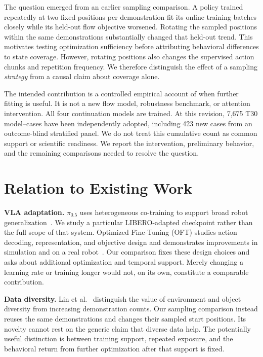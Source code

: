 \documentclass[conference]{IEEEtran}
\newcommand{\piV}{\ensuremath{\pi_{0.5}}}
\begin{document}
The question emerged from an earlier sampling comparison. A policy trained repeatedly at two fixed positions per demonstration fit its online training batches closely while its held-out flow objective worsened. Rotating the sampled positions within the same demonstrations substantially changed that held-out trend. This motivates testing optimization sufficiency before attributing behavioral differences to state coverage. However, rotating positions also changes the supervised action chunks and repetition frequency. We therefore distinguish the effect of a sampling \emph{strategy} from a causal claim about coverage alone.

The intended contribution is a controlled empirical account of when further fitting is useful. It is not a new flow model, robustness benchmark, or attention intervention. All four continuation models are trained. At this revision, 7,675 T30 model--cases have been independently adopted, including 423 new cases from an outcome-blind stratified panel. We do not treat this cumulative count as common support or scientific readiness. We report the intervention, preliminary behavior, and the remaining comparisons needed to resolve the question.

\section{Relation to Existing Work}
\textbf{VLA adaptation.} \piV{} uses heterogeneous co-training to support broad robot generalization~\cite{pi05}. We study a particular LIBERO-adapted checkpoint rather than the full scope of that system. Optimized Fine-Tuning (OFT) studies action decoding, representation, and objective design and demonstrates improvements in simulation and on a real robot~\cite{oft}. Our comparison fixes these design choices and asks about additional optimization and temporal support. Merely changing a learning rate or training longer would not, on its own, constitute a comparable contribution.

\textbf{Data diversity.} Lin et al.~\cite{scaling} distinguish the value of environment and object diversity from increasing demonstration counts. Our sampling comparison instead reuses the same demonstrations and changes their sampled start positions. Its novelty cannot rest on the generic claim that diverse data help. The potentially useful distinction is between training support, repeated exposure, and the behavioral return from further optimization after that support is fixed.
\end{document}
